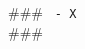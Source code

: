 

\usepackage{comment}

###
    \lstinline[style=verbatim-text]| - X |  \\
###


\begin{comment}
Author = DIEGO MICCOLI
Alias = Kozen88
Organization = SWAP Research Group UniBa
Date = 27-12-2023

This mini template is not working by itself because there are latex command missing needed
to compile the file and give as output a pdf file, in addition it has been added jinja
statement in order to control the rendering of the latex file with the jinja library, for these
reasons it needs to be used with the other mini chunks in conjunction.
\end{comment}